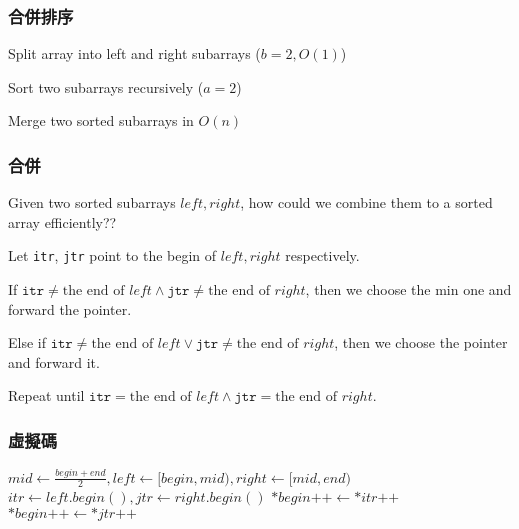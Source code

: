 \documentclass{beamer}
\begin{document}
\frame
{
	\frametitle{合併排序}
	
	\begin{description}
		\item<1->[Divide]Split array into left and right subarrays ($b = 2, O(1)$)
		\item<2->[Conquer]Sort two subarrays recursively ($a = 2$)
		\item<3->[Combine]Merge two sorted subarrays in $O(n)$
	\end{description}
}

\frame
{
	\frametitle{合併}
	
	Given two sorted subarrays $left, right$, how could we combine them to a sorted array efficiently??\pause
	
	Let \texttt{itr}, \texttt{jtr} point to the begin of $left, right$ respectively.\pause
	
	If $\texttt{itr} \neq \text{the end of }left \land \texttt{jtr} \neq \text{the end of }right$, then we choose the min one and forward the pointer.\pause
	
	Else if $\texttt{itr} \neq \text{the end of }left \lor \texttt{jtr} \neq \text{the end of }right$, then we choose the pointer and forward it.\pause
	
	Repeat until $\texttt{itr} = \text{the end of }left \land \texttt{jtr} = \text{the end of }right$.
}

\frame
{
	\frametitle{虛擬碼}
	
	\begin{algorithmic}
			\pause
				\State\Return
			\EndIf
			\pause
            \State$mid\gets\frac{begin+end}{2}, left\gets[begin, mid), right\gets[mid, end)$
            \pause
            \State{}
            \State{} 
            \pause
            \State$itr\gets left.begin(), jtr\gets right.begin()$
					\State$*begin\texttt{++}\gets*itr\texttt{++}$
				\Else
					\State$*begin\texttt{++}\gets*jtr\texttt{++}$
				\EndIf
            \EndWhile
        \EndProcedure
	\end{algorithmic}
}
\end{document}
